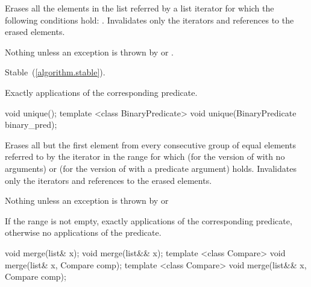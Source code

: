 \begin{itemdescr}
\pnum
\effects
Erases all the elements in the list referred by a list iterator  for which the
following conditions hold: .
Invalidates only the iterators and references to the erased elements.

\pnum
\throws
Nothing unless an exception is thrown by
or
.

\pnum
\remarks Stable~(\ref{algorithm.stable}).

\pnum
\complexity
Exactly
applications of the corresponding predicate.
\end{itemdescr}

%
\begin{itemdecl}
                                 void unique();
template <class BinaryPredicate> void unique(BinaryPredicate binary_pred);
\end{itemdecl}

\begin{itemdescr}
\pnum
\effects
Erases all but the first element from every
consecutive group of equal elements referred to by the iterator  in the range
 for which  (for the version of
 with no arguments) or  (for the version of
 with a predicate argument) holds.
Invalidates only the iterators and references to the erased elements.

\pnum
\throws
Nothing unless an exception is thrown by
or

\pnum
\complexity
If the range
\tcode{[first, last)}
is not empty, exactly
applications of the corresponding predicate,
otherwise no applications of the predicate.
\end{itemdescr}

%
\begin{itemdecl}
void                          merge(list& x);
void                          merge(list&& x);
template <class Compare> void merge(list& x, Compare comp);
template <class Compare> void merge(list&& x, Compare comp);
\end{itemdecl}

